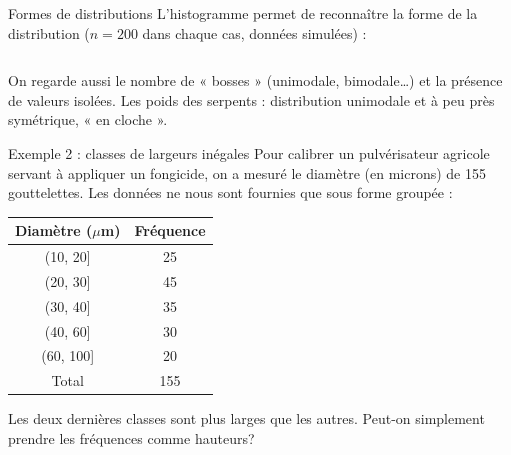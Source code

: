 \documentclass{BeamerTemplate}
\begin{document}
\begin{frame}[t]{Formes de distributions}
  L'histogramme permet de reconnaître la \alert{forme} de la distribution
  ($n = 200$ dans chaque cas, données simulées) :

  \begin{columns}[T,onlytextwidth]
    \centering
    \centering
    \centering
  \end{columns}

  \medskip
  On regarde aussi le nombre de « bosses » (\alert{unimodale},
  \alert{bimodale}\ldots) et la présence de valeurs isolées. Les poids des
  serpents : distribution unimodale et à peu près symétrique, « en cloche ».

\end{frame}

\begin{frame}[t]{Exemple 2 : classes de largeurs inégales}
  Pour calibrer un pulvérisateur agricole servant à appliquer un fongicide, on
  a mesuré le diamètre (en microns) de 155 gouttelettes. Les données ne nous
  sont fournies que sous forme groupée :

  \begin{center}
  \begin{tabular}{cc}
    \toprule
    Diamètre ($\mu$m) & Fréquence \\
    \midrule
    (10, 20] & 25 \\
    (20, 30] & 45 \\
    (30, 40] & 35 \\
    (40, 60] & 30 \\
    (60, 100] & 20 \\
    \midrule
    Total & 155 \\
    \bottomrule
  \end{tabular}
  \end{center}

  \medskip
  Les deux dernières classes sont \alert{plus larges} que les autres.
  Peut-on simplement prendre les fréquences comme hauteurs?
\end{frame}
\end{document}

